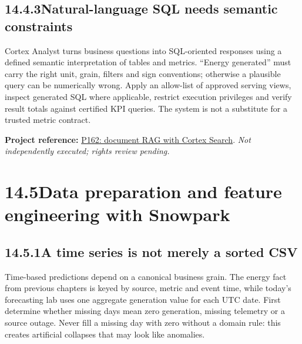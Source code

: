 \documentclass[11pt,twoside]{article}
\newcommand{\topic}[2]{\subsection*{#1\quad #2}}
\newcommand{\repo}[2]{\par\begingroup\fontsize{8.0}{9.6}\selectfont\sffamily\color{inkgray}\textbf{Project reference:} \href{#2}{#1}. \textit{Not independently executed; rights review pending.}\par\endgroup}
\begin{document}
\topic{14.4.3}{Natural-language SQL needs semantic constraints}
Cortex Analyst turns business questions into SQL-oriented responses using a defined semantic interpretation of tables and metrics. ``Energy generated'' must carry the right unit, grain, filters and sign conventions; otherwise a plausible query can be numerically wrong. Apply an allow-list of approved serving views, inspect generated SQL where applicable, restrict execution privileges and verify result totals against certified KPI queries. The system is not a substitute for a trusted metric contract.
\repo{P162: document RAG with Cortex Search}{https://github.com/Snowflake-Labs/sfguide-ask-questions-to-your-documents-using-rag-with-snowflake-cortex-search}

\newpage

\section*{14.5\quad Data preparation and feature engineering with Snowpark}
\topic{14.5.1}{A time series is not merely a sorted CSV}
Time-based predictions depend on a canonical business grain. The energy fact from previous chapters is keyed by source, metric and event time, while today's forecasting lab uses one aggregate generation value for each UTC date. First determine whether missing days mean zero generation, missing telemetry or a source outage. Never fill a missing day with zero without a domain rule: this creates artificial collapses that may look like anomalies.
\end{document}

